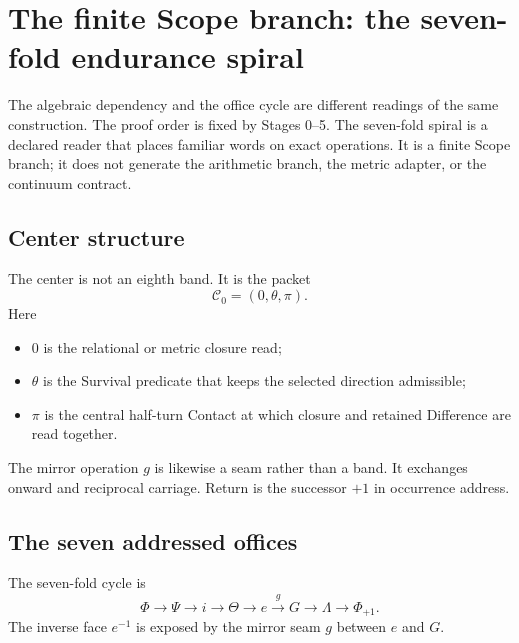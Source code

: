\documentclass[11pt]{article}
\begin{document}
\section{The finite Scope branch: the seven-fold endurance spiral}

The algebraic dependency and the office cycle are different readings of the same construction. The proof order is fixed by Stages 0--5. The seven-fold spiral is a declared reader that places familiar words on exact operations. It is a finite Scope branch; it does not generate the arithmetic branch, the metric adapter, or the continuum contract.

\subsection{Center structure}

The center is not an eighth band. It is the packet
\[
\boxed{\mathcal C_0=(0,\theta,\pi).}
\]
Here
\begin{itemize}
\item $0$ is the relational or metric closure read;
\item $\theta$ is the Survival predicate that keeps the selected direction admissible;
\item $\pi$ is the central half-turn Contact at which closure and retained Difference are read together.
\end{itemize}

The mirror operation $g$ is likewise a seam rather than a band. It exchanges onward and reciprocal carriage. Return is the successor $+1$ in occurrence address.

\subsection{The seven addressed offices}

The seven-fold cycle is
\[
\boxed{
\Phi
\longrightarrow
\Psi
\longrightarrow
i
\longrightarrow
\Theta
\longrightarrow
e
\xrightarrow{\ g\ }
G
\longrightarrow
\Lambda
\longrightarrow
\Phi_{+1}.
}
\]
The inverse face $e^{-1}$ is exposed by the mirror seam $g$ between $e$ and $G$.
\end{document}
